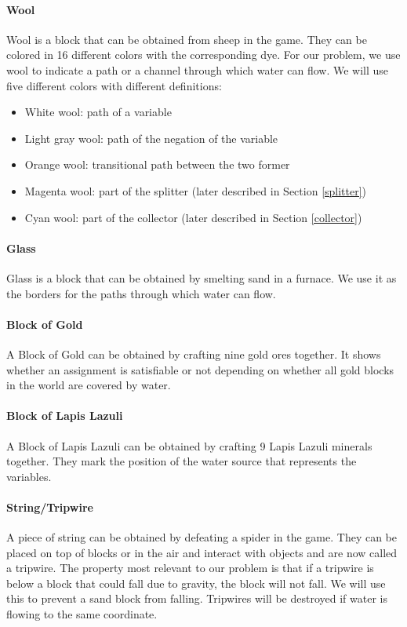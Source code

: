 \paragraph{Wool\cite{minecraftfandom:wool}}
Wool is a block that can be obtained from sheep in the game.
They can be colored in 16 different colors with the corresponding dye.
For our problem, we use wool to indicate a path or a channel through which water can flow.
We will use five different colors with different definitions:
\begin{itemize}
    \item White wool: path of a variable
    \item Light gray wool: path of the negation of the variable
    \item Orange wool: transitional path between the two former
    \item Magenta wool: part of the splitter (later described in Section \ref{splitter})
    \item Cyan wool: part of the collector (later described in Section \ref{collector})
\end{itemize}

\paragraph{Glass\cite{minecraftfandom:glass}}
Glass is a block that can be obtained by smelting sand in a furnace.
We use it as the borders for the paths through which water can flow.

\paragraph{Block of Gold\cite{minecraftfandom:bog}}
A Block of Gold can be obtained by crafting nine gold ores together.
\newline It shows whether an assignment is satisfiable or not depending on whether all gold blocks in the world are covered by water.

\paragraph{Block of Lapis Lazuli\cite{minecraftfandom:boll}}
A Block of Lapis Lazuli can be obtained by crafting 9 Lapis Lazuli minerals together.
They mark the position of the water source that represents the variables.

\paragraph{String/Tripwire\cite{minecraftfandom:string}}
A piece of string can be obtained by defeating a spider in the game.
They can be placed on top of blocks or in the air and interact with objects and are now called a tripwire.
The property most relevant to our problem is that if a tripwire is below a block that could fall due to gravity, the block will not fall.
We will use this to prevent a sand block from falling.
Tripwires will be destroyed if water is flowing to the same coordinate.


